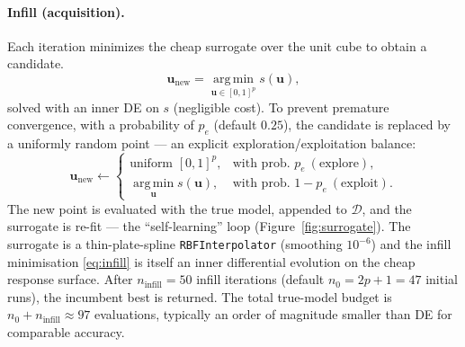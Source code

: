 \documentclass{article}
\begin{document}
\paragraph{Infill (acquisition).} Each iteration minimizes the cheap surrogate over
the unit cube to obtain a candidate.
\begin{equation}
  \bm{u}_{\mathrm{new}}=\operatorname*{arg\,min}_{\bm{u}\in[0,1]^p} s(\bm{u}),
  \label{eq:infill}
\end{equation}
solved with an inner DE on $s$ (negligible cost). To prevent premature
convergence, with a probability of $p_e$ (default $0.25$), the candidate is replaced by a
uniformly random point — an explicit exploration/exploitation balance:
\begin{equation}
  \bm{u}_{\mathrm{new}}\leftarrow
  \begin{cases}
    \text{uniform } [0,1]^p, & \text{with prob. } p_e \ (\text{explore}),\\[2pt]
    \operatorname*{arg\,min}_{\bm u} s(\bm u), & \text{with prob. } 1-p_e \ (\text{exploit}).
  \end{cases}
\end{equation}
The new point is evaluated with the true model, appended to $\mathcal{D}$, and the
surrogate is re-fit — the ``self-learning'' loop (Figure~\ref{fig:surrogate}).
The surrogate is a thin-plate-spline \texttt{RBFInterpolator} (smoothing
$10^{-6}$) and the infill minimisation \eqref{eq:infill} is itself an inner
differential evolution on the cheap response surface. After
$n_{\mathrm{infill}}=50$ infill iterations (default $n_0=2p+1=47$ initial runs),
the incumbent best is returned. The total true-model budget is
$n_0+n_{\mathrm{infill}}\approx 97$ evaluations, typically an order of magnitude
smaller than DE for comparable accuracy.
\end{document}
